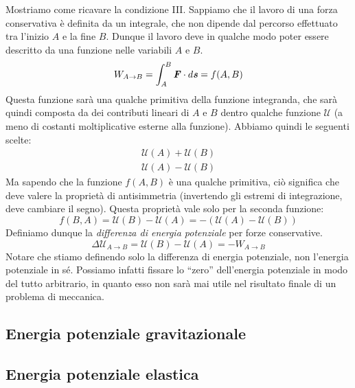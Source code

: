 Mostriamo come ricavare la condizione III. Sappiamo che il lavoro di una
forza conservativa è definita da un integrale, che non dipende dal percorso
effettuato tra l'inizio $A$ e la fine $B$. Dunque il lavoro deve in qualche modo
poter essere descritto da una funzione nelle variabili $A$ e $B$.
\[ W_{A \to B} = \int_{A}^{B}\textbf{\textit{F}}\cdot d\textbf{\textit{s}} = f(A,B) \]
Questa funzione sarà una qualche primitiva della funzione integranda, che sarà
quindi composta da dei contributi lineari di $A$ e $B$ dentro qualche funzione
$\mathcal{U}$ (a meno di costanti moltiplicative esterne alla funzione).
Abbiamo quindi le seguenti scelte:
\begin{align*}
    \mathcal{U}(A) + \mathcal{U}(B)\\
    \mathcal{U}(A) - \mathcal{U}(B)
\end{align*}
Ma sapendo che la funzione $f(A,B)$ è una qualche primitiva, ciò significa che
deve valere la proprietà di antisimmetria (invertendo gli estremi di integrazione,
deve cambiare il segno). Questa proprietà vale solo per la seconda funzione:
\[ f(B,A) = \mathcal{U}(B) - \mathcal{U}(A) = - (\mathcal{U}(A) - \mathcal{U}(B)) \]
Definiamo dunque la \textit{differenza di energia potenziale} per forze conservative.
\[ \Delta\mathcal{U}_{A\to B} = \mathcal{U}(B) - \mathcal{U}(A) = -W_{A\to B} \]
Notare che stiamo definendo solo la differenza di energia potenziale, non l'energia
potenziale in sé. Possiamo infatti fissare lo ``zero'' dell'energia potenziale in
modo del tutto arbitrario, in quanto esso non sarà mai utile nel risultato finale
di un problema di meccanica.

\subsection{Energia potenziale gravitazionale}
\subsection{Energia potenziale elastica}

